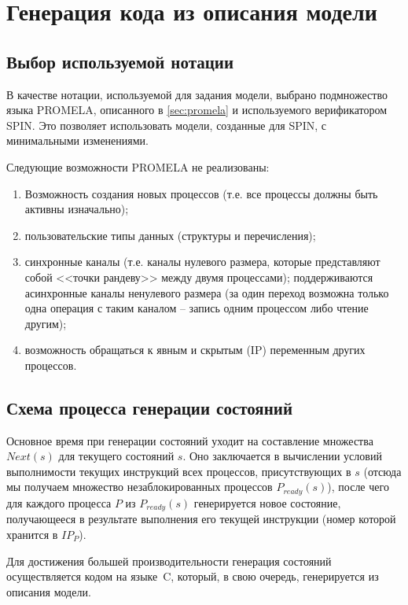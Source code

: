 \chapter{Генерация кода из описания модели}
\label{cha:code-gen}

\section{Выбор используемой нотации}
\label{sec:notation-choice}

В качестве нотации, используемой для задания модели, выбрано подмножество языка PROMELA,
описанного в \ref{sec:promela} и используемого верификатором SPIN. Это позволяет
использовать модели, созданные для SPIN, с минимальными изменениями. 

Следующие возможности PROMELA не реализованы:

\begin{enumerate}
\item Возможность создания новых процессов (т.е. все процессы должны быть активны изначально);
\item пользовательские типы данных (структуры и перечисления);
\item синхронные каналы (т.е. каналы нулевого размера, которые представляют собой <<точки
  рандеву>> между двумя процессами); поддерживаются асинхронные каналы ненулевого размера
  (за один переход возможна только одна операция с таким каналом -- запись одним процессом
  либо чтение другим);
\item возможность обращаться к явным и скрытым (IP) переменным других процессов.
\end{enumerate}

\section{Схема процесса генерации состояний}
\label{sec:idef0-codegen}

Основное время при генерации состояний уходит на составление множества $Next(s)$ для
текущего состояний $s$. Оно заключается в вычислении условий выполнимости текущих
инструкций всех процессов, присутствующих в $s$ (отсюда мы получаем множество
незаблокированных процессов $P_{ready}(s)$), после чего для каждого процесса $P$ из
$P_{ready}(s)$ генерируется новое состояние, получающееся в результате выполнения его
текущей инструкции (номер которой хранится в $IP_P$).

Для достижения большей производительности генерация состояний осуществляется кодом на
языке~C, который, в свою очередь, генерируется из описания модели.


